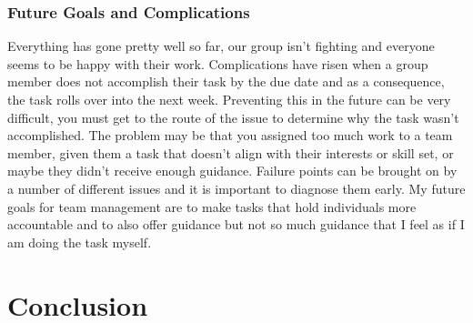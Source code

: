\documentclass[draftclsnofoot, onecolumn, 10pt, compsoc]{IEEEtran}
\begin{document}
\subsubsection{Future Goals and Complications}
Everything has gone pretty well so far, our group isn't fighting and everyone seems to be happy with their work. Complications have risen when a group member does not accomplish their task by the due date and as a consequence, the task rolls over into the next week. Preventing this in the future can be very difficult, you must get to the route of the issue to determine why the task wasn't accomplished. The problem may be that you assigned too much work to a team member, given them a task that doesn't align with their interests or skill set, or maybe they didn't receive enough guidance. Failure points can be brought on by a number of different issues and it is important to diagnose them early. My future goals for team management are to make tasks that hold individuals more accountable and to also offer guidance but not so much guidance that I feel as if I am doing the task myself.
\section{Conclusion}



\end{document}
